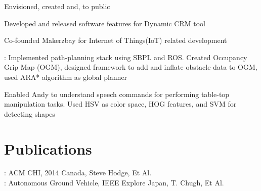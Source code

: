 \documentclass[]{resume-openfont}
\begin{document}
\begin{minipage}[t]{0.63\textwidth}
\begin{tightemize}
\end{tightemize}
\sectionsep

\begin{tightemize}
\item Envisioned, created and, \href{https://github.com/Microsoft/kinect-ripple}{} to public \href{https://www.youtube.com/watch?v=_0K4iZdMjLw}{}
\item Developed and released software features for Dynamic CRM tool 
\item Co-founded Makerzbay for Internet of Things(IoT) related development 
\end{tightemize}
\sectionsep

\begin{tightemize}
\item \href{https://mrsdprojects.ri.cmu.edu/2015teamb/media/fall-and-spring-videos/}{}: Implemented path-planning stack using SBPL and ROS. Created Occupancy Grip  Map (OGM), designed framework to add and inflate obstacle data to OGM, used ARA* algorithm as global planner
\item \href{http://www.tusharchugh.org/works/andy/}{} 
Enabled Andy to understand speech commands for performing table-top manipulation tasks. Used HSV as color space, HOG features, and SVM for detecting shapes
\end{tightemize}
\sectionsep


\section{Publications}
\href{http://research.microsoft.com/pubs/207114/2014-02-14\%20CHI\%20sticker\%20circuits.pdf}{}: ACM CHI, 2014 Canada, Steve Hodge, Et Al. \\
\href{http://ieeexplore.ieee.org/xpl/login.jsp?tp=&arnumber=5558532&url=http\%3A\%2F\%2Fieeexplore.ieee.org\%2Fxpls\%2Fabs_all.jsp\%3Farnumber\%3D5558532}{}: Autonomous Ground Vehicle, IEEE Explore Japan, T. Chugh, Et Al.



\end{minipage}
\end{document}
